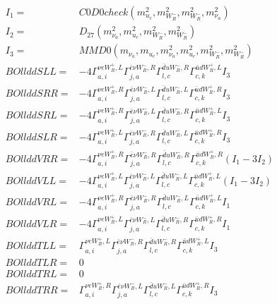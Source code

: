 \documentclass[A4,landscape]{article}
\begin{document}
\begin{align} 
I_1 = & C0D0check(m^2_{u_{{c}}}, m^2_{W_R^-}, m^2_{W_R^-}, m^2_{\nu_{{a}}}) \\ 
I_2 = & D_{27}(m^2_{\nu_{{a}}}, m^2_{u_{{c}}}, m^2_{W_R^-}, m^2_{W_R^-}) \\ 
I_3 = & MMD0(m_{\nu_{{a}}}, m_{u_{{c}}}, m^2_{\nu_{{a}}}, m^2_{u_{{c}}}, m^2_{W_R^-}, m^2_{W_R^-}) \\ 
  BOllddSLL= & -4  \Gamma^{\nu e W_R^+,L}_{a, i} \Gamma^{\bar{e}\nu W_R^- ,R}_{j, a} \Gamma^{\bar{d}u W_R^- ,R}_{l, c} \Gamma^{\bar{u}d W_R^+,L}_{c, k} I_3 \\ 
  BOllddSRR= & -4  \Gamma^{\nu e W_R^+,R}_{a, i} \Gamma^{\bar{e}\nu W_R^- ,L}_{j, a} \Gamma^{\bar{d}u W_R^- ,L}_{l, c} \Gamma^{\bar{u}d W_R^+,R}_{c, k} I_3 \\ 
  BOllddSRL= & -4  \Gamma^{\nu e W_R^+,R}_{a, i} \Gamma^{\bar{e}\nu W_R^- ,L}_{j, a} \Gamma^{\bar{d}u W_R^- ,R}_{l, c} \Gamma^{\bar{u}d W_R^+,L}_{c, k} I_3 \\ 
  BOllddSLR= & -4  \Gamma^{\nu e W_R^+,L}_{a, i} \Gamma^{\bar{e}\nu W_R^- ,R}_{j, a} \Gamma^{\bar{d}u W_R^- ,L}_{l, c} \Gamma^{\bar{u}d W_R^+,R}_{c, k} I_3 \\ 
  BOllddVRR= & -4  \Gamma^{\nu e W_R^+,R}_{a, i} \Gamma^{\bar{e}\nu W_R^- ,R}_{j, a} \Gamma^{\bar{d}u W_R^- ,R}_{l, c} \Gamma^{\bar{u}d W_R^+,R}_{c, k} (I_1 - 3 I_2) \\ 
  BOllddVLL= & -4  \Gamma^{\nu e W_R^+,L}_{a, i} \Gamma^{\bar{e}\nu W_R^- ,L}_{j, a} \Gamma^{\bar{d}u W_R^- ,L}_{l, c} \Gamma^{\bar{u}d W_R^+,L}_{c, k} (I_1 - 3 I_2) \\ 
  BOllddVRL= & -4  \Gamma^{\nu e W_R^+,R}_{a, i} \Gamma^{\bar{e}\nu W_R^- ,R}_{j, a} \Gamma^{\bar{d}u W_R^- ,L}_{l, c} \Gamma^{\bar{u}d W_R^+,L}_{c, k} I_1 \\ 
  BOllddVLR= & -4  \Gamma^{\nu e W_R^+,L}_{a, i} \Gamma^{\bar{e}\nu W_R^- ,L}_{j, a} \Gamma^{\bar{d}u W_R^- ,R}_{l, c} \Gamma^{\bar{u}d W_R^+,R}_{c, k} I_1 \\ 
  BOllddTLL= &  \Gamma^{\nu e W_R^+,L}_{a, i} \Gamma^{\bar{e}\nu W_R^- ,R}_{j, a} \Gamma^{\bar{d}u W_R^- ,R}_{l, c} \Gamma^{\bar{u}d W_R^+,L}_{c, k} I_3 \\ 
  BOllddTLR= & 0 \\ 
  BOllddTRL= & 0 \\ 
  BOllddTRR= &  \Gamma^{\nu e W_R^+,R}_{a, i} \Gamma^{\bar{e}\nu W_R^- ,L}_{j, a} \Gamma^{\bar{d}u W_R^- ,L}_{l, c} \Gamma^{\bar{u}d W_R^+,R}_{c, k} I_3 \\ 
\end{align} 
\end{document}
